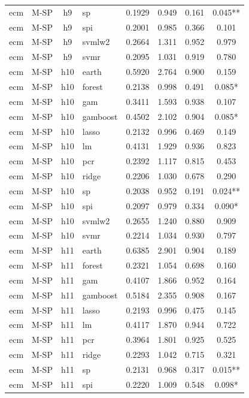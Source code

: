\begin{ThreePartTable}
\begin{longtable}[t]{llclcccc}
ecm & M-SP & h9 & sp & 0.1929 & 0.949 & 0.161 & 0.045**\\
ecm & M-SP & h9 & spi & 0.2001 & 0.985 & 0.366 & 0.101\\
ecm & M-SP & h9 & svmlw2 & 0.2664 & 1.311 & 0.952 & 0.979\\
ecm & M-SP & h9 & svmr & 0.2095 & 1.031 & 0.919 & 0.780\\
\addlinespace
ecm & M-SP & h10 & earth & 0.5920 & 2.764 & 0.900 & 0.159\\
ecm & M-SP & h10 & forest & 0.2138 & 0.998 & 0.491 & 0.085*\\
ecm & M-SP & h10 & gam & 0.3411 & 1.593 & 0.938 & 0.107\\
ecm & M-SP & h10 & gamboost & 0.4502 & 2.102 & 0.904 & 0.085*\\
ecm & M-SP & h10 & lasso & 0.2132 & 0.996 & 0.469 & 0.149\\
ecm & M-SP & h10 & lm & 0.4131 & 1.929 & 0.936 & 0.823\\
ecm & M-SP & h10 & pcr & 0.2392 & 1.117 & 0.815 & 0.453\\
ecm & M-SP & h10 & ridge & 0.2206 & 1.030 & 0.678 & 0.290\\
ecm & M-SP & h10 & sp & 0.2038 & 0.952 & 0.191 & 0.024**\\
ecm & M-SP & h10 & spi & 0.2097 & 0.979 & 0.334 & 0.090*\\
ecm & M-SP & h10 & svmlw2 & 0.2655 & 1.240 & 0.880 & 0.909\\
ecm & M-SP & h10 & svmr & 0.2214 & 1.034 & 0.930 & 0.797\\
\addlinespace
ecm & M-SP & h11 & earth & 0.6385 & 2.901 & 0.904 & 0.189\\
ecm & M-SP & h11 & forest & 0.2321 & 1.054 & 0.698 & 0.160\\
ecm & M-SP & h11 & gam & 0.4107 & 1.866 & 0.952 & 0.164\\
ecm & M-SP & h11 & gamboost & 0.5184 & 2.355 & 0.908 & 0.167\\
ecm & M-SP & h11 & lasso & 0.2193 & 0.996 & 0.475 & 0.145\\
ecm & M-SP & h11 & lm & 0.4117 & 1.870 & 0.944 & 0.722\\
ecm & M-SP & h11 & pcr & 0.3964 & 1.801 & 0.925 & 0.525\\
ecm & M-SP & h11 & ridge & 0.2293 & 1.042 & 0.715 & 0.321\\
ecm & M-SP & h11 & sp & 0.2131 & 0.968 & 0.317 & 0.015**\\
ecm & M-SP & h11 & spi & 0.2220 & 1.009 & 0.548 & 0.098*\\

\end{longtable}
\end{ThreePartTable}
